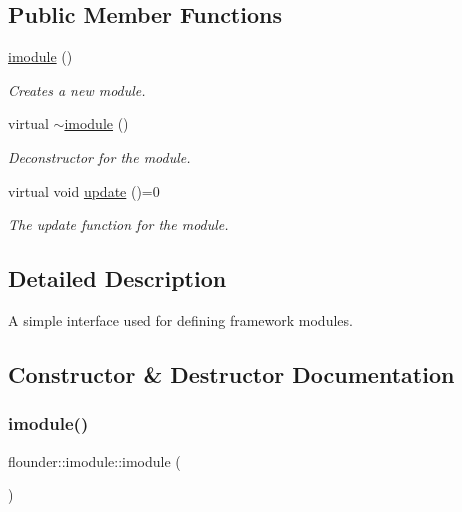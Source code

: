 \subsection*{Public Member Functions}
\begin{DoxyCompactItemize}
\item 
\hyperlink{classflounder_1_1imodule_aa0b5648a6adbcf8c333820d967a37aeb}{imodule} ()
\begin{DoxyCompactList}\small\item\em Creates a new module. \end{DoxyCompactList}\item 
virtual \hyperlink{classflounder_1_1imodule_a519b8530d27d6c21d591e12e776ef834}{$\sim$imodule} ()
\begin{DoxyCompactList}\small\item\em Deconstructor for the module. \end{DoxyCompactList}\item 
virtual void \hyperlink{classflounder_1_1imodule_a9a53d48a46b5f6b16a92b2cd8503f74a}{update} ()=0
\begin{DoxyCompactList}\small\item\em The update function for the module. \end{DoxyCompactList}\end{DoxyCompactItemize}


\subsection{Detailed Description}
A simple interface used for defining framework modules. 



\subsection{Constructor \& Destructor Documentation}
\mbox{\label{classflounder_1_1imodule_aa0b5648a6adbcf8c333820d967a37aeb}} 
\subsubsection{\texorpdfstring{imodule()}{imodule()}}
{\footnotesize\ttfamily flounder\+::imodule\+::imodule (\begin{DoxyParamCaption}{ }\end{DoxyParamCaption})\hspace{0.3cm}{\ttfamily [inline]}}



